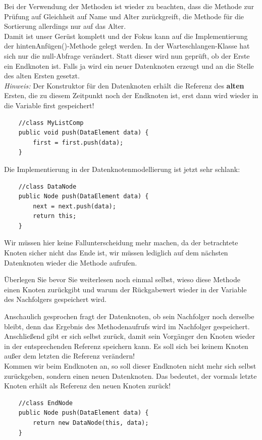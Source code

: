 \documentclass{article}
\begin{document}
Bei der Verwendung der Methoden ist wieder zu beachten, dass die Methode zur Prüfung auf Gleichheit auf Name und Alter zurückgreift, die Methode für die Sortierung allerdings nur auf das Alter. \\
Damit ist unser Gerüst komplett und der Fokus kann auf die Implementierung der hintenAnfügen()-Methode gelegt werden. In der Warteschlangen-Klasse hat sich nur die null-Abfrage verändert. Statt dieser wird nun geprüft, ob der Erste ein Endknoten ist. Falls ja wird ein neuer Datenknoten erzeugt und an die Stelle des alten Ersten gesetzt. \\
\textit{Hinweis:} Der Konstruktor für den Datenknoten erhält die Referenz des \textbf{alten} Ersten, die zu diesem Zeitpunkt noch der Endknoten ist, erst dann wird wieder in die Variable first gespeichert! 
\begin{verbatim}
    //class MyListComp
    public void push(DataElement data) {
        first = first.push(data);
    }
\end{verbatim}
Die Implementierung in der Datenknotenmodellierung ist jetzt sehr schlank: 
\begin{verbatim}
    //class DataNode
    public Node push(DataElement data) {
        next = next.push(data);
        return this; 
    }
\end{verbatim}
Wir müssen hier keine Fallunterscheidung mehr machen, da der betrachtete Knoten sicher nicht das Ende ist, wir müssen lediglich auf dem nächsten Datenknoten wieder die Methode aufrufen. \\
\begin{task}{1}
Überlegen Sie bevor Sie weiterlesen noch einmal selbst, wieso diese Methode einen Knoten zurückgibt und warum der Rückgabewert wieder in der Variable des Nachfolgers gespeichert wird. 
\end{task}
\vspace{2cm}
Anschaulich gesprochen fragt der Datenknoten, ob sein Nachfolger noch derselbe bleibt, denn das Ergebnis des Methodenaufrufs wird im Nachfolger gespeichert. Anschließend gibt er sich selbst zurück, damit sein Vorgänger den Knoten wieder in der entsprechenden Referenz speichern kann. Es soll sich bei keinem Knoten außer dem letzten die Referenz verändern! \\
Kommen wir beim Endknoten an, so soll dieser Endknoten nicht mehr sich selbst zurückgeben, sondern einen neuen Datenknoten. Das bedeutet, der vormals letzte Knoten erhält als Referenz den neuen Knoten zurück! 
\begin{verbatim}
    //class EndNode
    public Node push(DataElement data) {
        return new DataNode(this, data);
    }
\end{verbatim}
\end{document}
